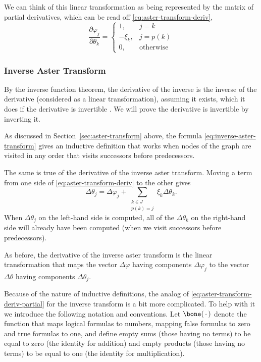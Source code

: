 We can think of this linear transformation as being represented by the matrix
of partial derivatives, which can be read off \eqref{eq:aster-transform-deriv},
\begin{equation} \label{eq:aster-transform-deriv-partial}
   \frac{\partial \varphi_j}{\partial \theta_k}
   =
   \begin{cases}
   1, & j = k \\
   - \xi_k, & j = p(k) \\
   0, & \text{otherwise}
   \end{cases}
\end{equation}

\subsubsection{Inverse Aster Transform}
\label{sec:inverse-aster-transform-deriv}

By the inverse function theorem, the derivative of the inverse is the
inverse of the derivative (considered as a linear transformation), assuming
it exists, which it does if the derivative is invertible
\cite[p.~361--363]{lang}.  We will prove the derivative is invertible by
inverting it.

As discussed in Section~\ref{sec:aster-transform} above,
the formula \eqref{eq:inverse-aster-transform}
gives an inductive definition that works when nodes of the graph are visited
in any order that visits successors before predecessors.

The same is true of the derivative of the inverse aster transform.
Moving a term from one side of \eqref{eq:aster-transform-deriv}
to the other gives
\begin{equation} \label{eq:inverse-aster-transform-deriv}
   \Delta \theta_j
   =
   \Delta \varphi_j
   +
   \sum_{\substack{k \in J \\ p(k) = j}} \xi_k \Delta \theta_k.
\end{equation}
When $\Delta \theta_j$ on the left-hand side is computed,
all of the $\Delta \theta_k$ on the
right-hand side will already have been computed (when we visit successors
before predecessors).

As before, the derivative of the inverse
aster transform is the linear transformation that maps
the vector $\Delta \varphi$ having components $\Delta \varphi_j$ to
the vector $\Delta \theta$ having components $\Delta \theta_j$.

Because of the nature of inductive definitions, the analog
of \eqref{eq:aster-transform-deriv-partial} for the inverse transform
is a bit more complicated.
To help with it we introduce the following notation and conventions.
Let $\bone(\fatdot)$ denote the function that maps logical formulas
to numbers, mapping false formulas to zero and true formulas to one,
and define empty sums (those having no terms) to be equal to zero
(the identity for addition)
and empty products (those having no terms) to be equal to one
(the identity for multiplication).

